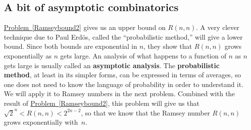 \documentclass[10pt,]{book}
\newcommand{\terminology}[1]{\textbf{#1}}
\theoremstyle{plain}
\theoremstyle{definition}
\theoremstyle{definition}
\numberwithin{equation}{chapter}
\newcommand{\lt}{<}
\begin{document}
\subsection[{A bit of asymptotic combinatorics}]{A bit of asymptotic combinatorics}\label{subsection-16}
\hypertarget{p-517}{}%
\hyperref[Ramseybound2]{Problem~\ref{Ramseybound2}} gives us an upper bound on \(R(n,n)\). A very clever technique due to Paul Erdös, called the ``probabilistic method,'' will give a lower bound. Since both bounds are exponential in \(n\), they show that \(R(n,n)\) grows exponentially as \(n\) gets large. An analysis of what happens to a function of \(n\) as \(n\) gets large is usually called an \terminology{asymptotic analysis}. The \terminology{probabilistic method}, at least in its simpler forms, can be expressed in terms of averages, so one does not need to know the language of probability in order to understand it. We will apply it to Ramsey numbers in the next problem. Combined with the result of \hyperref[Ramseybound2]{Problem~\ref{Ramseybound2}}, this problem will give us that \(\sqrt{2}^{ n}\lt R(n,n)\lt 2^{2n-2}\), so that we know that the Ramsey number \(R(n,n)\) grows exponentially with~\(n\).%
\end{document}
